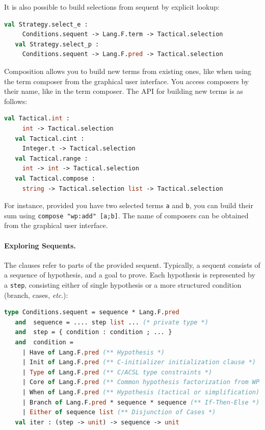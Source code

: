 It is also possible to build selections from sequent by explicit lookup:
\begin{lstlisting}[language=ocaml]
   val Strategy.select_e :
     Conditions.sequent -> Lang.F.term -> Tactical.selection
   val Strategy.select_p :
     Conditions.sequent -> Lang.F.pred -> Tactical.selection
\end{lstlisting}

Composition allows you to build new terms from existing ones, like when using the term composer from the graphical user interface. You access composers by their name, like in the term composer. The API for building new terms is as follows:
\begin{lstlisting}[language=ocaml]
   val Tactical.int :
     int -> Tactical.selection
   val Tactical.cint :
     Integer.t -> Tactical.selection
   val Tactical.range :
     int -> int -> Tactical.selection
   val Tactical.compose :
     string -> Tactical.selection list -> Tactical.selection
\end{lstlisting}

For instance, provided you have two selected terms \lstinline$a$ and \lstinline$b$, you can build their sum using
\lstinline$compose "wp:add" [a;b]$. The name of composers can be obtained from the graphical user interface.

\paragraph{Exploring Sequents.}
The clauses refer to parts of the provided sequent. Typically, a sequent consists of a
sequence of hypothesis, and a goal to prove. Each hypothesis is represented by a \lstinline$step$, consisting either of single hypothesis or a more structured condition
(branch, cases, \textit{etc}.):

\begin{lstlisting}[language=ocaml]
   type Conditions.sequent = sequence * Lang.F.pred
   and  sequence = .... step list ... (* private type *)
   and  step = { condition : condition ; ... }
   and  condition =
     | Have of Lang.F.pred (** Hypothesis *)
     | Init of Lang.F.pred (** C-initializer initialization clause *)
     | Type of Lang.F.pred (** C/ACSL type constraints *)
     | Core of Lang.F.pred (** Common hypothesis factorization from WP *)
     | When of Lang.F.pred (** Hypothesis (tactical or simplification) *)
     | Branch of Lang.F.pred * sequence * sequence (** If-Then-Else *)
     | Either of sequence list (** Disjunction of Cases *)
   val iter : (step -> unit) -> sequence -> unit
\end{lstlisting}

